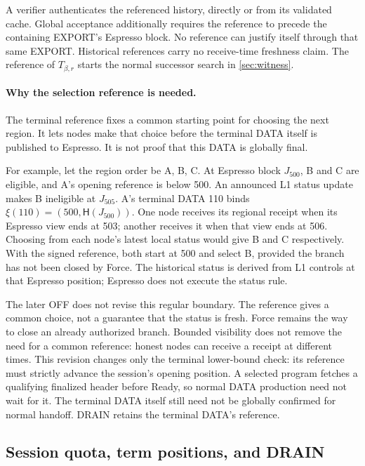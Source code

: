 \documentclass[11pt,a4paper]{article}
\newcommand{\Hash}{\mathsf H}
\begin{document}
A verifier authenticates the referenced history, directly or from its
validated cache. Global acceptance additionally requires the reference
to precede the containing EXPORT's Espresso block. No reference can
justify itself through that same EXPORT. Historical references carry no
receive-time freshness claim. The reference of $T_{\beta,r}$ starts the normal
successor search in \cref{sec:witness}.

\paragraph{Why the selection reference is needed.}
The terminal reference fixes a common starting point for choosing the next
region. It lets nodes make that choice before the terminal DATA itself is
published to Espresso. It is not proof that this DATA is globally final.

For example, let the region order be A, B, C. At Espresso block $J_{500}$,
B and C are eligible, and A's opening reference is below 500. An announced
L1 status update makes B ineligible at
$J_{505}$. A's terminal DATA 110 binds $\xi(110)=(500,\Hash(J_{500}))$.
One node receives its regional receipt when its Espresso view ends at 503;
another receives it when that view ends at 506. Choosing from each node's
latest local status would give B and C respectively. With the signed
reference, both start at 500 and select B, provided the branch has not
been closed by Force. The historical status is derived from L1 controls
at that Espresso position; Espresso does not execute the status rule.

The later OFF does not revise this regular boundary. The reference gives
a common choice, not a guarantee that the status is fresh. Force remains
the way to close an already authorized branch. Bounded visibility does
not remove the need for a common reference: honest nodes can receive a
receipt at different times. This revision changes only the terminal
lower-bound check: its reference must strictly advance the session's
opening position. A selected program fetches a qualifying finalized
header before Ready, so normal DATA production need not wait for it.
The terminal DATA itself still need not be globally confirmed for normal
handoff. DRAIN retains the terminal DATA's reference.

\subsection{Session quota, term positions, and DRAIN}
\label{sec:quota}
\end{document}

